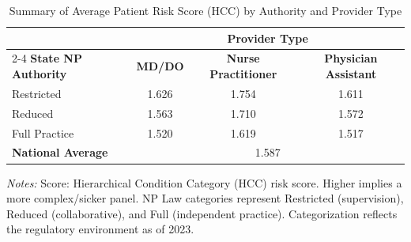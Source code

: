 \begin{table}[htbp]
    \centering
    \caption{Summary of Average Patient Risk Score (HCC) by Authority and Provider Type}
    \label{tab:bene_avg_risk_scre}
    \vspace{0.2cm}
    \begin{tabular}{lccc}
        \toprule
        & \multicolumn{3}{c}{\textbf{Provider Type}} \\
        \cmidrule(lr){2-4}
        \textbf{State NP Authority} & \textbf{MD/DO} & \textbf{Nurse Practitioner} & \textbf{Physician Assistant} \\
        \midrule
        Restricted & 1.626 & 1.754 & 1.611 \\
        Reduced & 1.563 & 1.710 & 1.572 \\
        Full Practice & 1.520 & 1.619 & 1.517 \\
        \midrule
        \textbf{National Average} & \multicolumn{3}{c}{1.587} \\
        \bottomrule
    \end{tabular}
    \vspace{0.1cm}
    \begin{minipage}{0.85\textwidth}
        \footnotesize \textit{Notes:} Score: Hierarchical Condition Category (HCC) risk score. Higher implies a more complex/sicker panel. NP Law categories represent Restricted (supervision), Reduced (collaborative), and Full (independent practice). Categorization reflects the regulatory environment as of 2023.
    \end{minipage}
\end{table}